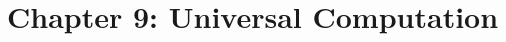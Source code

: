 %



\hypertarget{solutions_universal_computation}{}\label{solutions_universal_computation}
\section*{Chapter 9: Universal Computation}
\renewcommand{\chapterfolder}{universal_computation/}


